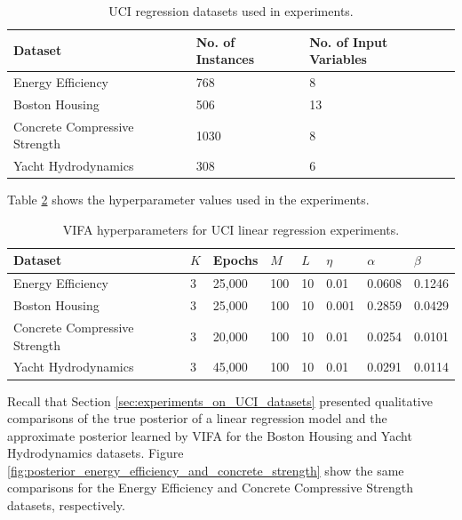 \documentclass[10pt]{article} %
\begin{document}
\begin{table}[h!]
\caption{UCI regression datasets used in experiments.}
\begin{center}
\begin{tabular}{l|ll}
\label{table:uci_datasets}
\textbf{Dataset}              & \textbf{No. of Instances} & \textbf{No. of Input Variables} \\ \hline
Energy Efficiency             & 768                       & 8                               \\
Boston Housing                & 506                       & 13                              \\
Concrete Compressive Strength & 1030                      & 8                               \\
Yacht Hydrodynamics           & 308                       & 6                    
\end{tabular}
\end{center}
\end{table}

Table \ref{table:vifa_uci_hyperparameters} shows the hyperparameter values used in the experiments.
\begin{table}[h!]
\caption{VIFA hyperparameters for UCI linear regression experiments.}
\begin{center}
\label{table:vifa_uci_hyperparameters}
\begin{tabular}{l|lllllll}
\textbf{Dataset} & \textbf{$K$} & \textbf{Epochs} & \textbf{$M$} & \textbf{$L$} & \textbf{$\eta$} & \textbf{$\alpha$} & \textbf{$\beta$} \\ \hline
Energy Efficiency 				& 3 & 25,000 & 100 & 10 	& 0.01 	& 0.0608 & 0.1246 \\ 
Boston Housing 				& 3 & 25,000 & 100 & 10 	& 0.001 	& 0.2859 & 0.0429 \\
 Concrete Compressive Strength	& 3 & 20,000 & 100 & 10 	& 0.01 	& 0.0254 & 0.0101 \\
 Yacht Hydrodynamics 			& 3 & 45,000 & 100 & 10 	& 0.01 	& 0.0291 & 0.0114 \\
\end{tabular}
\end{center}
\end{table}

Recall that Section \ref{sec:experiments_on_UCI_datasets} presented qualitative comparisons of the true posterior of a linear regression model and the approximate posterior learned by VIFA for the Boston Housing and Yacht Hydrodynamics datasets. Figure \ref{fig:posterior_energy_efficiency_and_concrete_strength} show the same comparisons for the Energy Efficiency and Concrete Compressive Strength datasets, respectively.  
\end{document}
